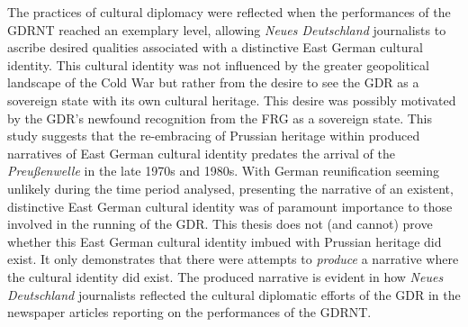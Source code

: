 The practices of cultural diplomacy were reflected when the performances of the GDRNT reached an exemplary level, allowing \textit{Neues Deutschland} journalists to ascribe desired qualities associated with a distinctive East German cultural identity. This cultural identity was not influenced by the greater geopolitical landscape of the Cold War but rather from the desire to see the GDR as a sovereign state with its own cultural heritage. This desire was possibly motivated by the GDR’s newfound recognition from the FRG as a sovereign state. This study suggests that the re-embracing of Prussian heritage within produced narratives of East German cultural identity predates the arrival of the \textit{Preußenwelle} in the late 1970s and 1980s. With German reunification seeming unlikely during the time period analysed, presenting the narrative of an existent, distinctive East German cultural identity was of paramount importance to those involved in the running of the GDR. This thesis does not (and cannot) prove whether this East German cultural identity imbued with Prussian heritage did exist. It only demonstrates that there were attempts to \textit{produce} a narrative where the cultural identity did exist. The produced narrative is evident in how \textit{Neues Deutschland} journalists reflected the cultural diplomatic efforts of the GDR in the newspaper articles reporting on the performances of the GDRNT. 